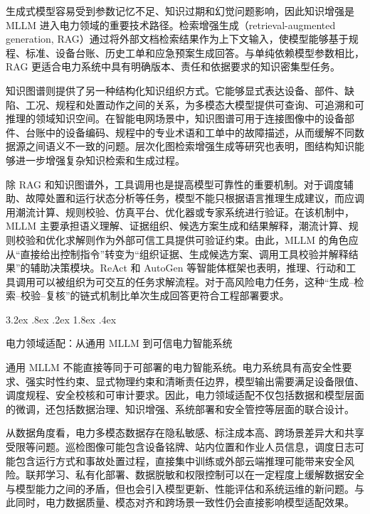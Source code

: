 \documentclass[10.5pt,compsoc]{CjC}
\makeatletter
\renewcommand\subsection{\@startsection{subsection}{2}{\z@}%
  {3.2ex \@plus .8ex \@minus .2ex}%
  {1.8ex \@plus .4ex}%
  {\normalfont\zihao{5}\heiti\bfseries\raggedright}}
\theoremstyle{mystyle}
\makeatother
\begin{document}
生成式模型容易受到参数记忆不足、知识过期和幻觉问题影响，因此知识增强是 MLLM 进入电力领域的重要技术路径。检索增强生成（retrieval-augmented generation, RAG）通过将外部文档检索结果作为上下文输入，使模型能够基于规程、标准、设备台账、历史工单和应急预案生成回答\cite{lewis2020retrieval}。与单纯依赖模型参数相比，RAG 更适合电力系统中具有明确版本、责任和依据要求的知识密集型任务。

知识图谱则提供了另一种结构化知识组织方式。它能够显式表达设备、部件、缺陷、工况、规程和处置动作之间的关系，为多模态大模型提供可查询、可追溯和可推理的领域知识空间\cite{ji2022survey}。在智能电网场景中，知识图谱可用于连接图像中的设备部件、台账中的设备编码、规程中的专业术语和工单中的故障描述，从而缓解不同数据源之间语义不一致的问题。层次化图检索增强生成等研究也表明，图结构知识能够进一步增强复杂知识检索和生成过程\cite{shen2026hgrag}。

除 RAG 和知识图谱外，工具调用也是提高模型可靠性的重要机制。对于调度辅助、故障处置和运行状态分析等任务，模型不能只根据语言推理生成建议，而应调用潮流计算、规则校验、仿真平台、优化器或专家系统进行验证\cite{zhangjun2023operation,yang2025operator,li2024risks}。在该机制中，MLLM 主要承担语义理解、证据组织、候选方案生成和结果解释，潮流计算、规则校验和优化求解则作为外部可信工具提供可验证约束。由此，MLLM 的角色应从``直接给出控制指令''转变为``组织证据、生成候选方案、调用工具校验并解释结果''的辅助决策模块。ReAct 和 AutoGen 等智能体框架也表明，推理、行动和工具调用可以被组织为可交互的任务求解流程\cite{yao2023react,wu2023autogen}。对于高风险电力任务，这种``生成--检索--校验--复核''的链式机制比单次生成回答更符合工程部署要求。

\subsection{电力领域适配：从通用 MLLM 到可信电力智能系统}

通用 MLLM 不能直接等同于可部署的电力智能系统。电力系统具有高安全性要求、强实时性约束、显式物理约束和清晰责任边界，模型输出需要满足设备限值、调度规程、安全校核和可审计要求。因此，电力领域适配不仅包括数据和模型层面的微调，还包括数据治理、知识增强、系统部署和安全管控等层面的联合设计。

从数据角度看，电力多模态数据存在隐私敏感、标注成本高、跨场景差异大和共享受限等问题。巡检图像可能包含设备铭牌、站内位置和作业人员信息，调度日志可能包含运行方式和事故处置过程，直接集中训练或外部云端推理可能带来安全风险\cite{li2024risks}。联邦学习、私有化部署、数据脱敏和权限控制可以在一定程度上缓解数据安全与模型能力之间的矛盾\cite{ouyang2026powervlm}，但也会引入模型更新、性能评估和系统运维的新问题。与此同时，电力数据质量、模态对齐和跨场景一致性仍会直接影响模型适配效果\cite{zhengxiang2025data}。
\end{document}
